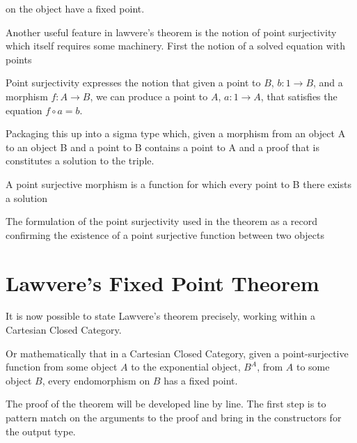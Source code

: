  on the object have a fixed point.

Another useful feature in lawvere's theorem is the notion of point surjectivity
which itself requires some machinery. First the notion of a solved equation with
points


Point surjectivity expresses the notion that given a point to $B$, $b : 1
\rightarrow B$, and a morphism $f : A \rightarrow B$, we can produce a point to
$A$, $a : 1 \rightarrow A$, that satisfies the equation $f \circ a = b$.

Packaging this up into a sigma type which, given a morphism from an object A to
an object B and a point to B contains a point to A and a proof that is
constitutes a solution to the triple.


A point surjective morphism is a function for which every point to B there
exists a solution


The formulation of the point surjectivity used in the theorem as a record
confirming the existence of a point surjective function between two objects


\section{Lawvere's Fixed Point Theorem}

It is now possible to state Lawvere's theorem precisely, working within a
Cartesian Closed Category.


Or mathematically that in a Cartesian Closed Category, given a point-surjective
function from some object $A$ to the exponential object, $B^A$, from $A$ to some object
$B$, every endomorphism on $B$ has a fixed point.

The proof of the theorem will be developed line by line. The first step is to
pattern match on the arguments to the proof and bring in the constructors for
the output type.

